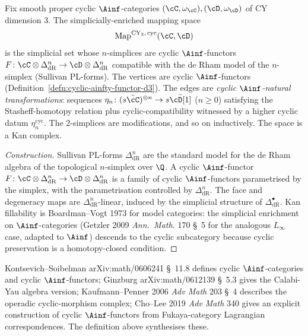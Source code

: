 \begin{proposition}
\label{prop:mapping-space-cy3-cyclic}
Fix smooth proper cyclic $\Ainf$-categories $(\cC, \omega_\cC),
(\cD, \omega_\cD)$ of CY dimension $3$.  The simplicially-enriched
mapping space
\[
  \mathrm{Map}^{\mathrm{CY}_3,\,\mathrm{cyc}}(\cC, \cD)
\]
is the simplicial set whose $n$-simplices are cyclic $\Ainf$-functors
$F \colon \cC \otimes \Delta^n_{\mathrm{dR}} \to \cD \otimes
\Delta^n_{\mathrm{dR}}$ compatible with the de Rham model of the
$n$-simplex (Sullivan PL-forms).  The vertices are cyclic
$\Ainf$-functors (Definition~\ref{defn:cyclic-ainfty-functor-d3}).  The
edges are \emph{cyclic $\Ainf$-natural transformations}: sequences
$\eta_n \colon (s\bar\cC)^{\otimes n} \to s\bar\cD[1]$ ($n \geq 0$)
satisfying the Stasheff-homotopy relation plus cyclic-compatibility
witnessed by a higher cyclic datum $\eta_n^{\mathrm{cyc}}$.  The
$2$-simplices are modifications, and so on inductively.  The space is
a Kan complex.
\end{proposition}

\begin{proof}[Construction]
Sullivan PL-forms $\Delta^n_{\mathrm{dR}}$ are the standard model for
the de Rham algebra of the topological $n$-simplex over $\Q$.  A
cyclic $\Ainf$-functor $F \colon \cC \otimes \Delta^n_{\mathrm{dR}}
\to \cD \otimes \Delta^n_{\mathrm{dR}}$ is a family of cyclic
$\Ainf$-functors parametrised by the simplex, with the parametrisation
controlled by $\Delta^n_{\mathrm{dR}}$.  The face and degeneracy maps
are $\Delta^n_{\mathrm{dR}}$-linear, induced by the simplicial
structure of $\Delta^\bullet_{\mathrm{dR}}$.  Kan fillability is
Boardman--Vogt 1973 for model categories: the simplicial enrichment on
$\Ainf$-categories (Getzler 2009 \emph{Ann.\ Math.} 170 \S~5 for the
analogous $L_\infty$ case, adapted to $\Ainf$) descends to the cyclic
subcategory because cyclic preservation is a homotopy-closed condition.
\end{proof}

\begin{remark}
\label{rem:cyclic-ainfty-morphism-literature}
Kontsevich--Soibelman arXiv:math/0606241 \S~11.8 defines cyclic
$\Ainf$-categories and cyclic $\Ainf$-functors; Ginzburg
arXiv:math/0612139 \S~5.3 gives the Calabi-Yau algebra version;
Kaufmann--Penner 2006 \emph{Adv Math} 203 \S~4 describes the operadic
cyclic-morphism complex; Cho--Lee 2019 \emph{Adv Math} 340 gives an
explicit construction of cyclic $\Ainf$-functors from Fukaya-category
Lagrangian correspondences.  The definition above synthesises these.
\end{remark}

